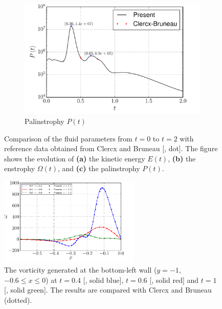 \begin{figure}[!p]
     \begin{subfigure}[b]{0.49\textwidth}
             \includegraphics[width=\textwidth]{figures/eulerian/dipole_Palinstrophy_comparison.pdf}
             \caption{Palinstrophy $P(t)$}
             \label{fig:dipole_Palinstrophy_comparison}
     \end{subfigure}
    
     \caption{Comparison of the fluid parameters from $t=0$ to $t=2$ with reference data obtained from Clercx and Bruneau \cite{Clercx2006a} [{\color{plotRed}{$\bullet$}}, {} dot]. The figure shows the evolution of \textbf{(a)} the kinetic energy $E(t)$, \textbf{(b)} the enstrophy $\Omega(t)$, and \textbf{(c)} the palinstrophy $P(t)$.}
     \label{fig:dipole_comparison}
	\end{figure}
		
	\begin{figure}[!p]
	\centering
		\includegraphics[width=0.6\textwidth]{./figures/eulerian/VorticityAtBoundary2.pdf}
		\caption{The vorticity generated at the bottom-left wall ($y=-1$, $-0.6\leqslant x \leqslant 0$) at $t=0.4$ [{\color{plotBlue}{---}}, solid blue], $t=0.6$ [{\color{plotRed}{---}}, solid red] and $t=1$ [{\color{plotGreen}{---}}, solid green]. The results are compared with Clercx and Bruneau \cite{Clercx2006a} (dotted).}
		\label{fig:VorticityAtBoundary}
	\end{figure}	
	
